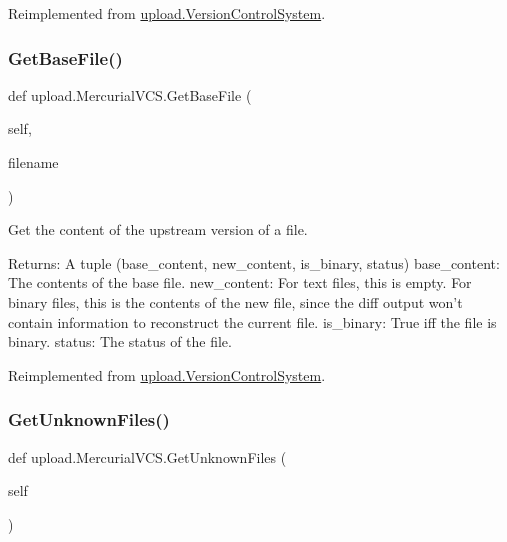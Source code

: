 Reimplemented from \mbox{\hyperlink{classupload_1_1_version_control_system_adfd9d4ecba422102233a2ba13e5bfaf5}{upload.\+Version\+Control\+System}}.

\mbox{\label{classupload_1_1_mercurial_v_c_s_a0cdc0cbe6ac4daab82f5f01e6ae2e670}} 
\subsubsection{\texorpdfstring{GetBaseFile()}{GetBaseFile()}\hspace{0.1cm}{\footnotesize\ttfamily [2/2]}}
{\footnotesize\ttfamily def upload.\+Mercurial\+V\+C\+S.\+Get\+Base\+File (\begin{DoxyParamCaption}\item[{}]{self,  }\item[{}]{filename }\end{DoxyParamCaption})}

\begin{DoxyVerb}Get the content of the upstream version of a file.

Returns:
  A tuple (base_content, new_content, is_binary, status)
base_content: The contents of the base file.
new_content: For text files, this is empty.  For binary files, this is
  the contents of the new file, since the diff output won't contain
  information to reconstruct the current file.
is_binary: True iff the file is binary.
status: The status of the file.
\end{DoxyVerb}
 

Reimplemented from \mbox{\hyperlink{classupload_1_1_version_control_system_adfd9d4ecba422102233a2ba13e5bfaf5}{upload.\+Version\+Control\+System}}.

\mbox{\label{classupload_1_1_mercurial_v_c_s_a6190899fb86cd09ad84cc5d4b0ebd2f3}} 
\subsubsection{\texorpdfstring{GetUnknownFiles()}{GetUnknownFiles()}\hspace{0.1cm}{\footnotesize\ttfamily [1/2]}}
{\footnotesize\ttfamily def upload.\+Mercurial\+V\+C\+S.\+Get\+Unknown\+Files (\begin{DoxyParamCaption}\item[{}]{self }\end{DoxyParamCaption})}

